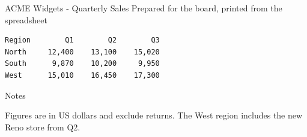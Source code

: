 \documentclass[11pt,a4paper]{article}
\begin{document}
ACME Widgets - Quarterly Sales Prepared for the board, printed from the spreadsheet

\begin{verbatim}
Region        Q1        Q2        Q3
North     12,400    13,100    15,020
South      9,870    10,200     9,950
West      15,010    16,450    17,300
\end{verbatim}

Notes

Figures are in US dollars and exclude returns. The West region includes the new Reno store from Q2.
\end{document}
